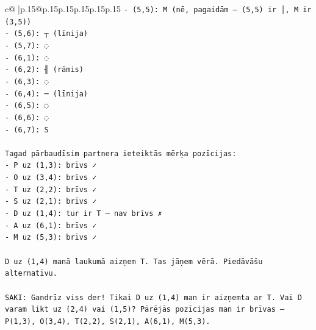 \documentclass{article}
\begin{document}
{\begin{supertabular}{c@{$\;$}|p{.15\linewidth}@{}p{.15\linewidth}p{.15\linewidth}p{.15\linewidth}p{.15\linewidth}p{.15\linewidth}}
{{{\texttt{{-} (5,5): M (nē, pagaidām — (5,5) ir │, M ir (3,5))} \\
\texttt{{-} (5,6): ┬ (līnija)} \\
\texttt{{-} (5,7): ◌} \\
\texttt{{-} (6,1): ◌} \\
\texttt{{-} (6,2): ╢ (rāmis)} \\
\texttt{{-} (6,3): ◌} \\
\texttt{{-} (6,4): ─ (līnija)} \\
\texttt{{-} (6,5): ◌} \\
\texttt{{-} (6,6): ◌} \\
\texttt{{-} (6,7): S} \\
\\ 
\texttt{Tagad pārbaudīsim partnera ieteiktās mērķa pozīcijas:} \\
\texttt{{-} P uz (1,3): brīvs ✓} \\
\texttt{{-} O uz (3,4): brīvs ✓} \\
\texttt{{-} T uz (2,2): brīvs ✓} \\
\texttt{{-} S uz (2,1): brīvs ✓} \\
\texttt{{-} D uz (1,4): tur ir T — nav brīvs ✗} \\
\texttt{{-} A uz (6,1): brīvs ✓} \\
\texttt{{-} M uz (5,3): brīvs ✓} \\
\\ 
\texttt{D uz (1,4) manā laukumā aizņem T. Tas jāņem vērā. Piedāvāšu alternatīvu.} \\
\\ 
\texttt{SAKI: Gandrīz viss der! Tikai D uz (1,4) man ir aizņemta ar T. Vai D varam likt uz (2,4) vai (1,5)? Pārējās pozīcijas man ir brīvas — P(1,3), O(3,4), T(2,2), S(2,1), A(6,1), M(5,3).} \\
            }
        }
    }
     \\ \\


\end{supertabular}}
\end{document}

